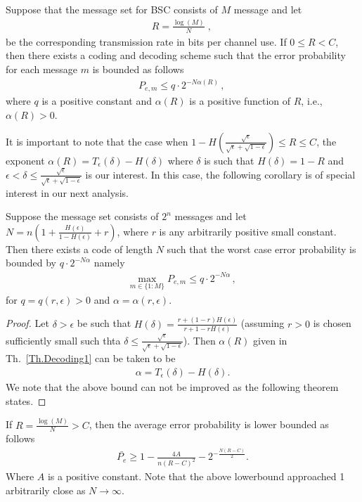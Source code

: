 \begin{theorem}
\label{Th.Decoding1}
Suppose that the message set for BSC consists of $M$ message and let
\begin{align}
    R = \frac{\log(M)}{N} \;,\,
\end{align}
be the corresponding transmission rate in bits per channel use. If $0\leq R < C$, then there exists a coding and decoding scheme such that the error probability for each message $m$ is bounded as follows
%
\begin{align}
    P_{e,m} \leq q\cdot2^{-N\alpha(R)} \,,\,
\end{align}
%
where $q$ is a positive constant and $\alpha(R)$ is a positive function of $R$, i.e., $\alpha(R)>0$.
\end{theorem}
It is important to note that the case when $1-H(\frac{\sqrt{\epsilon}}{\sqrt{\epsilon}+\sqrt{1-\epsilon}}) \leq R \leq C$, the exponent $\alpha(R) = T_{\epsilon}(\delta) - H(\delta)$ where $\delta$ is such that $H(\delta) = 1-R$ and $\epsilon < \delta \leq \frac{\sqrt{\epsilon}}{\sqrt{\epsilon}+\sqrt{1-\epsilon}}$ is our interest. In this case, the following corollary is of special interest in our next analysis.
\begin{corollary}
\label{C.amount.Trans}
    Suppose the message set consists of $2^n$ messages and let $N=n(1+\frac{H(\epsilon)}{1-H(\epsilon)}+r)$, where $r$ is any arbitrarily positive small constant. Then there exists a code of length $N$ such that the worst case error probability is bounded by $q\cdot2^{-N\alpha}$ namely
    \begin{align}
        \underset{m\in\{1:M\}}{\max} P_{e,m} \leq q\cdot2^{-N\alpha} \,,\,
    \end{align}
    for $q=q(r,\epsilon)>0$ and $\alpha=\alpha(r,\epsilon)$.
\end{corollary}
\begin{proof}
Let $\delta > \epsilon$ be such that $H(\delta) = \frac{r + (1-r)H(\epsilon)}{r+1-rH(\epsilon)}$ (assuming $r>0$ is chosen sufficiently small such thta $\delta\leq \frac{\sqrt{\epsilon}}{\sqrt{\epsilon}+\sqrt{1-\epsilon}}$). Then $\alpha(R)$ given in Th.~\ref{Th.Decoding1} can be taken to be
%
\begin{align}
    \alpha = T_{\epsilon}(\delta) - H(\delta).
\end{align}
%
We note that the above bound can not be improved as the following theorem states.
\end{proof}
\begin{theorem}
\label{Th.Decoding_Lowerbound}
If $R = \frac{\log(M)}{N} > C$, then the average error probability is lower bounded as follows
%
\begin{align}
    \bar{P_e} \geq 1-\frac{4A}{n(R-C)^2} - 2^{-\frac{N(R-C)}{2}}.
\end{align}
%
Where $A$ is a positive constant. Note that the above lowerbound approached 1 arbitrarily close as $N\to\infty$.
\end{theorem}
